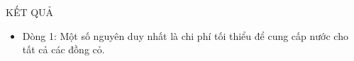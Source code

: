 KẾT QUẢ  
\begin{itemize}
	\item     Dòng 1: Một số nguyên duy nhất là chi phí tối thiểu         để cung cấp nước cho tất cả các đồng cỏ.   
\end{itemize}